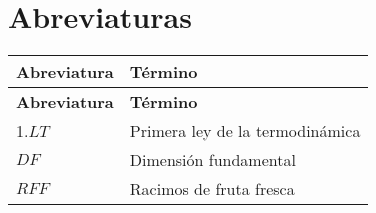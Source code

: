 \section*{Abreviaturas}
\begin{longtable}[l]{>{}l<{}l}
  \textbf{Abreviatura} & \textbf{T\'{e}rmino} \\[0.5ex] \hline%
  \endfirsthead%
  \textbf{Abreviatura} & \textbf{T\'{e}rmino} \\[0.5ex] \hline%
  \endhead%
\renewcommand{\arraystretch}{1.4}\label{simbolosg}
 1.$LT$&Primera ley de la termodin\'{a}mica\\%
 $DF$    &Dimensi\'{o}n fundamental\\%
 $RFF$   &Racimos de fruta fresca\\%

\end{longtable}


\setlength{\extrarowheight}{0pt}